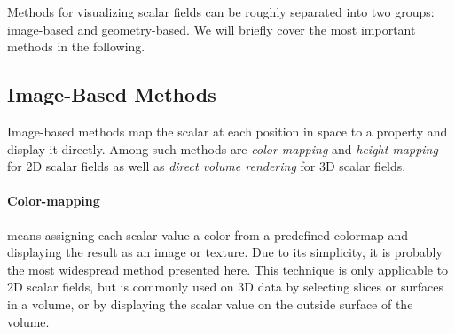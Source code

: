 %
%
Methods for visualizing scalar fields can be roughly separated into two groups:
image-based and geometry-based.
%
We will briefly cover the most important methods in the following.
%
%

\subsection{Image-Based Methods} %
\label{sub:image_based_methods}
%
Image-based methods map the scalar at each position in space to a property and
display it directly.
%
Among such methods are \emph{color-mapping} and \emph{height-mapping} for
\ac{2D} scalar fields as well as \emph{direct volume rendering} for \ac{3D}
scalar fields.
%

%
\paragraph{Color-mapping} means assigning each scalar value a color from a
predefined colormap and displaying the result as an image or texture.
%
Due to its simplicity, it is probably the most widespread method presented here.
%
This technique is only applicable to \ac{2D} scalar fields, but is commonly used
on \ac{3D} data by selecting slices or surfaces in a volume, or by displaying
the scalar value on the outside surface of the volume.
%

